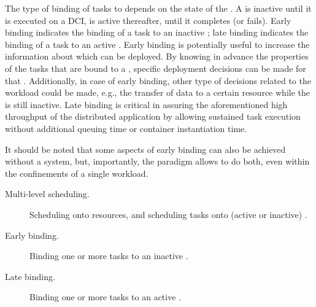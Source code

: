 \documentclass{sig-alternate}
\begin{document}
The type of binding of tasks to \pilots depends on the state of the \pilot. A
\pilot is inactive until it is executed on a DCI, is active thereafter, until
it completes (or fails).  Early binding indicates the binding of a task to an
inactive \pilot; late binding indicates the binding of a task to an active
\pilot. Early binding is potentially useful to increase the information about
which \pilots can be deployed. By knowing in advance the properties of the
tasks that are bound to a \pilot, specific deployment decisions can be made for
that \pilot.  Additionally, in case of early binding, other type of decisions
related to the workload could be made, e.g., the transfer of data to a certain
resource while the \pilot is still inactive. Late binding is critical in
assuring the aforementioned high throughput of the distributed application by
allowing sustained task execution without additional queuing time or container
instantiation time.

It should be noted that some aspects of early binding can also be achieved
without a \pilot system, but, importantly, the \pilot paradigm allows to do
both, even within the confinements of a single workload.


\begin{description}

\item[Multi-level scheduling.] Scheduling \pilots onto resources, and
scheduling tasks onto (active or inactive) \pilots.

\item[Early binding.] Binding one or more tasks to an inactive \pilot.

\item[Late binding.] Binding one or more tasks to an active \pilot.

\end{description}

\end{document}
